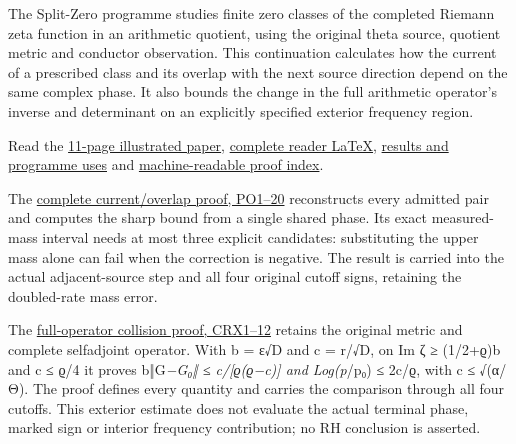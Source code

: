 \documentclass[
]{article}
\begin{document}
The Split-Zero programme studies finite zero classes of the completed
Riemann zeta function in an arithmetic quotient, using the original
theta source, quotient metric and conductor observation. This
continuation calculates how the current of a prescribed class and its
overlap with the next source direction depend on the same complex phase.
It also bounds the change in the full arithmetic operator's inverse and
determinant on an explicitly specified exterior frequency region.

Read the
\href{https://github.com/KokunoYumeto/zeta-function-research-reader/blob/main/workbenches/splitzero-tandem/continuations/20260922-current-collision/CURRENT_AND_COLLISION.pdf}{11-page
illustrated paper},
\href{https://github.com/KokunoYumeto/zeta-function-research-reader/blob/main/workbenches/splitzero-tandem/continuations/20260922-current-collision/CURRENT_AND_COLLISION.tex}{complete
reader LaTeX},
\href{https://github.com/KokunoYumeto/zeta-function-research-reader/blob/main/workbenches/splitzero-tandem/continuations/20260922-current-collision/RESULTS_20260922_030.md}{results
and programme uses} and
\href{https://github.com/KokunoYumeto/zeta-function-research-reader/blob/main/workbenches/splitzero-tandem/continuations/20260922-current-collision/PUBLICATION_INDEX.json}{machine-readable
proof index}.

The
\href{https://github.com/KokunoYumeto/zeta-function-research-reader/blob/main/workbenches/splitzero-tandem/continuations/20260922-current-collision/PHASE_OVERLAP_PROOF.md\#L29}{complete
current/overlap proof, PO1--20} reconstructs every admitted pair and
computes the sharp bound from a single shared phase. Its exact
measured-mass interval needs at most three explicit candidates:
substituting the upper mass alone can fail when the correction is
negative. The result is carried into the actual adjacent-source step and
all four original cutoff signs, retaining the doubled-rate mass error.

The
\href{https://github.com/KokunoYumeto/zeta-function-research-reader/blob/main/workbenches/splitzero-tandem/continuations/20260922-current-collision/COLLISION_RESOLVENT_EXTERIOR.md\#L11}{full-operator
collision proof, CRX1--12} retains the original metric and complete
selfadjoint operator. With b = ε√D and c = \textbar r\textbar/√D, on
\textbar Im ζ\textbar{} ≥ (1/2+ϱ)b and c ≤ ϱ/4 it proves b‖G\emph{−G₀‖ ≤
c/{[}ϱ(ϱ−c){]} and \textbar Log(p}/p₀)\textbar{} ≤ 2c/ϱ, with c ≤
√(α/Θ). The proof defines every quantity and carries the comparison
through all four cutoffs. This exterior estimate does not evaluate the
actual terminal phase, marked sign or interior frequency contribution;
no RH conclusion is asserted.
\end{document}
